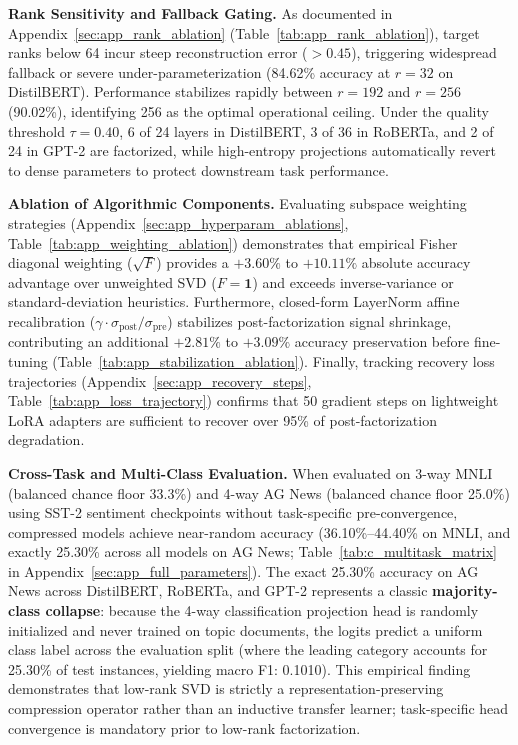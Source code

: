 \textbf{Rank Sensitivity and Fallback Gating.} As documented in Appendix~\ref{sec:app_rank_ablation} (Table~\ref{tab:app_rank_ablation}), target ranks below 64 incur steep reconstruction error ($> 0.45$), triggering widespread fallback or severe under-parameterization (84.62\% accuracy at $r=32$ on DistilBERT). Performance stabilizes rapidly between $r=192$ and $r=256$ (90.02\%), identifying 256 as the optimal operational ceiling. Under the quality threshold $\tau = 0.40$, 6 of 24 layers in DistilBERT, 3 of 36 in RoBERTa, and 2 of 24 in GPT-2 are factorized, while high-entropy projections automatically revert to dense parameters to protect downstream task performance.

\textbf{Ablation of Algorithmic Components.} Evaluating subspace weighting strategies (Appendix~\ref{sec:app_hyperparam_ablations}, Table~\ref{tab:app_weighting_ablation}) demonstrates that empirical Fisher diagonal weighting ($\sqrt{F}$) provides a $+3.60\%$ to $+10.11\%$ absolute accuracy advantage over unweighted SVD ($F=\mathbf{1}$) and exceeds inverse-variance or standard-deviation heuristics. Furthermore, closed-form LayerNorm affine recalibration ($\gamma \cdot \sigma_\text{post}/\sigma_\text{pre}$) stabilizes post-factorization signal shrinkage, contributing an additional $+2.81\%$ to $+3.09\%$ accuracy preservation before fine-tuning (Table~\ref{tab:app_stabilization_ablation}). Finally, tracking recovery loss trajectories (Appendix~\ref{sec:app_recovery_steps}, Table~\ref{tab:app_loss_trajectory}) confirms that 50 gradient steps on lightweight LoRA adapters are sufficient to recover over 95\% of post-factorization degradation.

\textbf{Cross-Task and Multi-Class Evaluation.} When evaluated on 3-way MNLI (balanced chance floor 33.3\%) and 4-way AG News (balanced chance floor 25.0\%) using SST-2 sentiment checkpoints without task-specific pre-convergence, compressed models achieve near-random accuracy (36.10\%--44.40\% on MNLI, and exactly 25.30\% across all models on AG News; Table~\ref{tab:c_multitask_matrix} in Appendix~\ref{sec:app_full_parameters}). The exact 25.30\% accuracy on AG News across DistilBERT, RoBERTa, and GPT-2 represents a classic \textbf{majority-class collapse}: because the 4-way classification projection head is randomly initialized and never trained on topic documents, the logits predict a uniform class label across the evaluation split (where the leading category accounts for 25.30\% of test instances, yielding macro F1: 0.1010). This empirical finding demonstrates that low-rank SVD is strictly a representation-preserving compression operator rather than an inductive transfer learner; task-specific head convergence is mandatory prior to low-rank factorization.